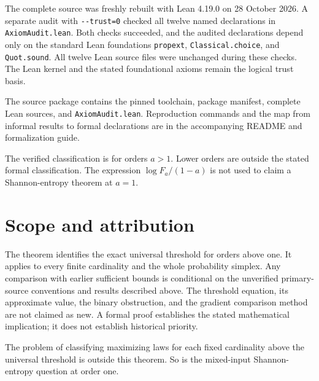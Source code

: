 \documentclass[11pt,a4paper]{article}
\newcommand{\code}[1]{\texttt{\small #1}}
\begin{document}
The complete source was freshly rebuilt with Lean 4.19.0 on 28 October
2026. A separate audit with \code{-{}-trust=0} checked all twelve named
declarations in \code{AxiomAudit.lean}. Both checks succeeded, and the
audited declarations depend only on the standard Lean foundations
\code{propext}, \code{Classical.choice}, and \code{Quot.sound}.
All twelve Lean source files were unchanged during these checks. The Lean
kernel and the stated foundational axioms remain the logical trust basis.

The source package contains the pinned toolchain, package manifest, complete
Lean sources, and \code{AxiomAudit.lean}. Reproduction commands and the
map from informal results to formal declarations are in the accompanying
README and formalization guide.

The verified classification is for orders $a>1$. Lower orders are outside
the stated formal classification. The expression
$\log F_a/(1-a)$ is not used to claim a Shannon-entropy theorem at $a=1$.

\section{Scope and attribution}

The theorem identifies the exact universal threshold for orders above one.
It applies to every finite cardinality and the whole probability simplex.
Any comparison with earlier sufficient bounds is conditional on the
unverified primary-source conventions and results described above. The threshold equation, its approximate value,
the binary obstruction, and the gradient comparison method are not claimed
as new. A formal proof establishes the stated mathematical implication;
it does not establish historical priority.

The problem of classifying maximizing laws for each fixed cardinality
above the universal threshold is outside this theorem. So is the
mixed-input Shannon-entropy question at order one.



\end{document}
